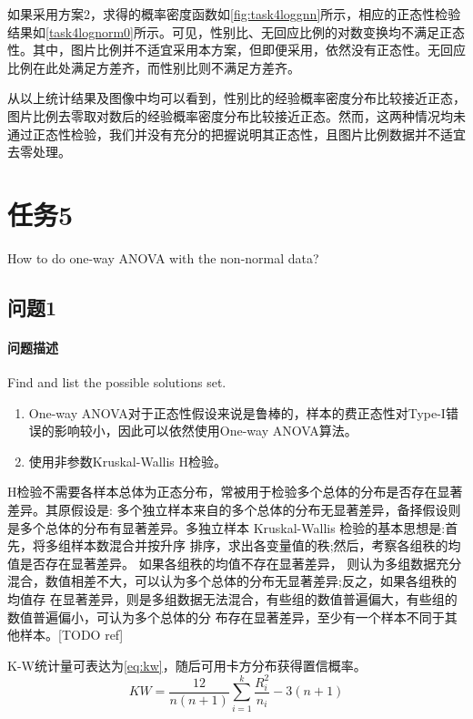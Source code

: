 \documentclass[a4paper,12pt]{article}
\begin{document}
    如果采用方案2，求得的概率密度函数如\cref{fig:task4loggnn}所示，相应的正态性检验结果如\cref{task4lognorm0}所示。可见，性别比、无回应比例的对数变换均不满足正态性。其中，图片比例并不适宜采用本方案，但即便采用，依然没有正态性。无回应比例在此处满足方差齐，而性别比则不满足方差齐。

    

    从以上统计结果及图像中均可以看到，性别比的经验概率密度分布比较接近正态，图片比例去零取对数后的经验概率密度分布比较接近正态。然而，这两种情况均未通过正态性检验，我们并没有充分的把握说明其正态性，且图片比例数据并不适宜去零处理。
    \section{任务5} %
    How to do one-way ANOVA with the non-normal data?
    \subsection{问题1} %
    \paragraph{问题描述} Find and list the possible solutions set.
    \begin{enumerate}
      \item One-way ANOVA对于正态性假设来说是鲁棒的，样本的费正态性对Type-I错误的影响较小，因此可以依然使用One-way ANOVA算法。
      \item 使用非参数Kruskal-Wallis H检验。
    \end{enumerate}

    H检验不需要各样本总体为正态分布，常被用于检验多个总体的分布是否存在显著差异。其原假设是: 多个独立样本来自的多个总体的分布无显著差异，备择假设则是多个总体的分布有显著差异。多独立样本 Kruskal-Wallis 检验的基本思想是:首先，将多组样本数混合并按升序 排序，求出各变量值的秩;然后，考察各组秩的均值是否存在显著差异。 如果各组秩的均值不存在显著差异， 则认为多组数据充分混合，数值相差不大，可以认为多个总体的分布无显著差异;反之，如果各组秩的均值存 在显著差异，则是多组数据无法混合，有些组的数值普遍偏大，有些组的数值普遍偏小，可认为多个总体的分 布存在显著差异，至少有一个样本不同于其他样本。[TODO ref]

    K-W统计量可表达为\cref{eq:kw}，随后可用卡方分布获得置信概率。
    \begin{equation}
      \label{eq:kw}
      KW = \frac{12}{n(n+1)}\sum_{i=1}^k{\frac{R_i^2}{n_i}-3(n+1)}
    \end{equation}
\end{document}
